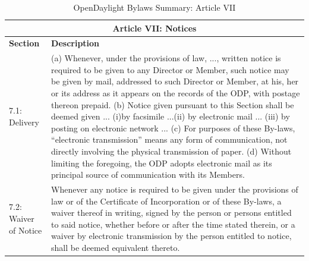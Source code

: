 \documentclass[a4paper, 12pt]{book}
\begin{document}
{\begin{table}[H]
  \begin{center}
    \begin{tabular}{ | p{4cm} | p{11cm} | }
    \toprule
    \multicolumn {2}{|c|}{\textbf{Article VII: Notices}} \\
    \hline
    \textbf{Section} & \textbf{Description} \\
    \hline
    7.1: Delivery & (a) Whenever, under the provisions of law, ..., written notice is required to be given to any Director or Member, such notice may be given by mail, addressed to such Director or Member, at his, her or its address as it appears on the records of the ODP, with postage thereon prepaid. (b) Notice given pursuant to this Section shall be deemed given ... (i)by facsimile ...(ii) by electronic mail ... (iii) by posting on electronic network ... (c) For purposes of these By-laws, “electronic transmission” means any form of communication, not directly involving the physical transmission of paper. (d) Without limiting the foregoing, the ODP adopts electronic mail as its principal source of communication with its Members.\\
    \hline
    7.2: Waiver of Notice & Whenever any notice is required to be given under the provisions of law or of the Certificate of Incorporation or of these By-laws, a waiver thereof in writing, signed by the person or persons entitled to said notice, whether before or after the time stated therein, or a waiver by electronic transmission by the person entitled to notice, shall be deemed equivalent thereto.\\
    \bottomrule
    \end{tabular}
    \caption{OpenDaylight Bylaws Summary: Article VII}
    \label{tab:odlbylaws-art07}
  \end{center}
\end{table}

}
\end{document}
